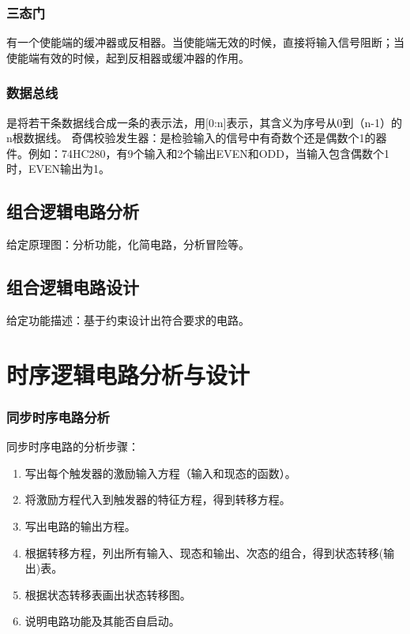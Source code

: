\documentclass{article}
\begin{document}
	\subsubsection{三态门}
	有一个使能端的缓冲器或反相器。当使能端无效的时候，直接将输入信号阻断；当使能端有效的时候，起到反相器或缓冲器的作用。
	\subsubsection{数据总线}
	是将若干条数据线合成一条的表示法，用[0:n]表示，其含义为序号从0到（n-1）的n根数据线。
	奇偶校验发生器：是检验输入的信号中有奇数个还是偶数个1的器件。例如：74HC280，有9个输入和2个输出EVEN和ODD，当输入包含偶数个1时，EVEN输出为1。
	\subsection{组合逻辑电路分析}
	给定原理图：分析功能，化简电路，分析冒险等。
	\subsection{组合逻辑电路设计}
	给定功能描述：基于约束设计出符合要求的电路。
	
	\section{时序逻辑电路分析与设计}
	\subsubsection{同步时序电路分析}
	同步时序电路的分析步骤：
	\begin{enumerate}
		\item 写出每个触发器的激励输入方程（输入和现态的函数）。
		\item 将激励方程代入到触发器的特征方程，得到转移方程。
		\item 写出电路的输出方程。
		\item 根据转移方程，列出所有输入、现态和输出、次态的组合，得到状态转移(输出)表。
		\item 根据状态转移表画出状态转移图。
		\item 说明电路功能及其能否自启动。
	\end{enumerate}
\end{document}
